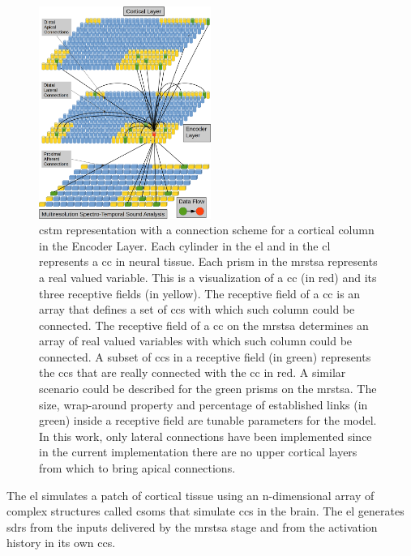 \documentclass[10pt,journal,compsoc]{IEEEtran}
\begin{document}
\begin{figure}[h!]
    \centering
    \includegraphics[width=0.5\textwidth]{EncoderColumnConnections.png}
    \caption{\gls{cstm} representation with a connection scheme for a cortical column in the Encoder Layer.
    Each cylinder in the \gls{el} and in the \gls{cl} represents a \gls{cc} in neural tissue.
    Each prism in the \gls{mrstsa} represents a real valued variable.
    This is a visualization of a \gls{cc} (in red) and its three receptive fields (in yellow).
    The receptive field of a \gls{cc} is an array that defines a set of \glspl{cc}
    with which such column could be connected.
    The receptive field of a \gls{cc} on the \gls{mrstsa} determines an array of real valued variables
    with which such column could be connected.
    A subset of \glspl{cc} in a receptive field (in green) represents the \glspl{cc} that are really
    connected with the \gls{cc} in red. A similar scenario could be described for the green prisms on
    the \gls{mrstsa}.
    The size, wrap-around property and percentage of established links (in green) inside a receptive field are tunable parameters for the model.
    In this work, only lateral connections have been implemented since in the current implementation there are no upper cortical layers from which
    to bring apical connections.}
    \label{fig:EncoderColumnConnections}
\end{figure}

The \gls{el} simulates a patch of cortical tissue using an n-dimensional array of complex structures called \glspl{csom} that simulate \glspl{cc} in the brain. The \gls{el} generates \glspl{sdr} \cite{ahmad_2016} from the inputs delivered by the \gls{mrstsa} stage and from the activation history in its own \glspl{cc}. 
\end{document}
